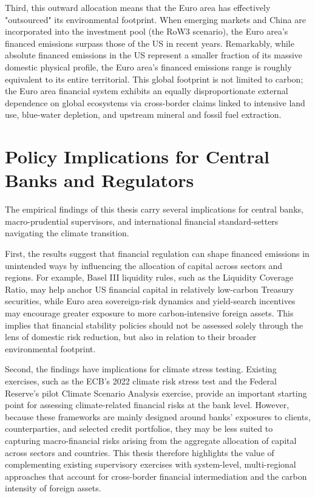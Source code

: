 Third, this outward allocation means that the Euro area has effectively "outsourced" its environmental footprint. When emerging markets and China are incorporated into the investment pool (the RoW3 scenario), the Euro area's financed emissions surpass those of the US in recent years. Remarkably, while absolute financed emissions in the US represent a smaller fraction of its massive domestic physical profile, the Euro area's financed emissions range is roughly equivalent to its entire territorial. This global footprint is not limited to carbon; the Euro area financial system exhibits an equally disproportionate external dependence on global ecosystems via cross-border claims linked to intensive land use, blue-water depletion, and upstream mineral and fossil fuel extraction.

\section{Policy Implications for Central Banks and Regulators}

The empirical findings of this thesis carry several implications for central banks, macro-prudential supervisors, and international financial standard-setters navigating the climate transition.

First, the results suggest that financial regulation can shape financed emissions in unintended ways by influencing the allocation of capital across sectors and regions. For example, Basel III liquidity rules, such as the Liquidity Coverage Ratio, may help anchor US financial capital in relatively low-carbon Treasury securities, while Euro area sovereign-risk dynamics and yield-search incentives may encourage greater exposure to more carbon-intensive foreign assets. This implies that financial stability policies should not be assessed solely through the lens of domestic risk reduction, but also in relation to their broader environmental footprint.

Second, the findings have implications for climate stress testing. Existing exercises, such as the ECB's 2022 climate risk stress test and the Federal Reserve's pilot Climate Scenario Analysis exercise, provide an important starting point for assessing climate-related financial risks at the bank level. However, because these frameworks are mainly designed around banks' exposures to clients, counterparties, and selected credit portfolios, they may be less suited to capturing macro-financial risks arising from the aggregate allocation of capital across sectors and countries. This thesis therefore highlights the value of complementing existing supervisory exercises with system-level, multi-regional approaches that account for cross-border financial intermediation and the carbon intensity of foreign assets.

